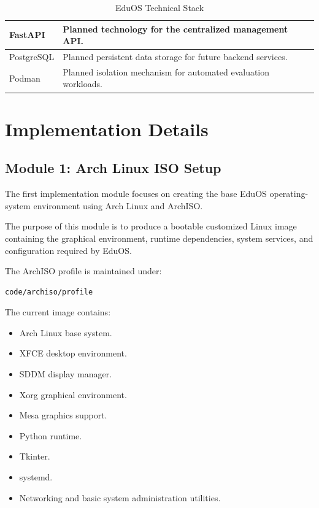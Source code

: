 \documentclass{tietreport}
\begin{document}
\begin{table}[H]
\begin{tabular}{|p{}|p{}|}
FastAPI &
Planned technology for the centralized management API. \\
\hline

PostgreSQL &
Planned persistent data storage for future backend services. \\
\hline

Podman &
Planned isolation mechanism for automated evaluation workloads. \\
\hline

\end{tabular}

\caption{EduOS Technical Stack}
\label{tab:technical-stack}
\end{table}



\section{Implementation Details}



\subsection{Module 1: Arch Linux ISO Setup}

The first implementation module focuses on creating the base EduOS
operating-system environment using Arch Linux and ArchISO.

The purpose of this module is to produce a bootable customized Linux
image containing the graphical environment, runtime dependencies,
system services, and configuration required by EduOS.

The ArchISO profile is maintained under:

\begin{verbatim}
code/archiso/profile
\end{verbatim}

The current image contains:

\begin{itemize}

    \item Arch Linux base system.
    \item XFCE desktop environment.
    \item SDDM display manager.
    \item Xorg graphical environment.
    \item Mesa graphics support.
    \item Python runtime.
    \item Tkinter.
    \item systemd.
    \item Networking and basic system administration utilities.

\end{itemize}
\end{document}
